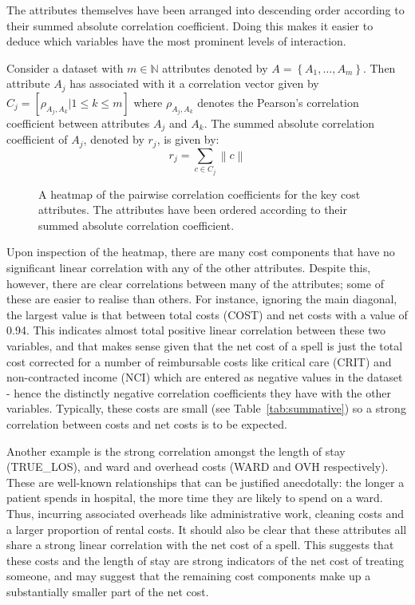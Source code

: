 The attributes themselves have been arranged into descending order according to
their summed absolute correlation coefficient. Doing this makes it easier to
deduce which variables have the most prominent levels of interaction.

\begin{definition}
    Consider a dataset with \(m \in \mathbb{N}\) attributes denoted
    by \(A = \left\{A_1, \ldots, A_m\right\}\). Then attribute \(A_j\) has
    associated with it a correlation vector given by \(C_j = \left[
    \rho_{A_j,A_k} | 1 \leq k \leq m\right]\) where \(\rho_{A_j, A_k}\) denotes
    the Pearson's correlation coefficient between attributes \(A_j\) and
    \(A_k\). The summed absolute correlation coefficient of \(A_j\), denoted by
    \(r_j\), is given by:
    \[
        r_j = \sum_{c \in C_j} \left\| c \right\|
    \]
\end{definition}

\begin{figure}[htbp]
    \caption{A heatmap of the pairwise correlation coefficients for the key cost
        attributes. The attributes have been ordered according to their summed
        absolute correlation coefficient.}%
    \label{fig:corr_heatmap}
\end{figure}

Upon inspection of the heatmap, there are many cost components that have no
significant linear correlation with any of the other attributes. Despite this,
however, there are clear correlations between many of the attributes; some of
these are easier to realise than others. For instance, ignoring the main
diagonal, the largest value is that between total costs (COST) and net costs
with a value of 0.94. This indicates almost total positive linear correlation
between these two variables, and that makes sense given that the net cost of a
spell is just the total cost corrected for a number of reimbursable costs like
critical care (CRIT) and non-contracted income (NCI) which are entered as
negative values in the dataset \-- hence the distinctly negative correlation
coefficients they have with the other variables. Typically, these costs are
small (see Table~\ref{tab:summative}) so a strong correlation between costs
and net costs is to be expected.

Another example is the strong correlation amongst the length of stay
(TRUE\_LOS), and ward and overhead costs (WARD and OVH respectively). These are
well-known relationships that can be justified anecdotally: the longer a patient
spends in hospital, the more time they are likely to spend on a ward. Thus,
incurring associated overheads like administrative work, cleaning costs and a
larger proportion of rental costs. It should also be clear that these attributes
all share a strong linear correlation with the net cost of a spell. This
suggests that these costs and the length of stay are strong indicators of the
net cost of treating someone, and may suggest that the remaining cost components 
make up a substantially smaller part of the net cost.


